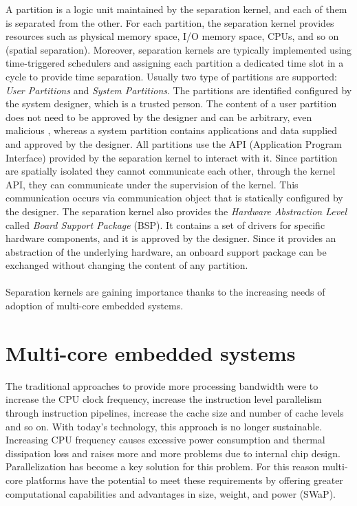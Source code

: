 A partition is a logic unit maintained by the separation kernel, and each of them is separated from the other. For each partition, the separation kernel provides resources such as physical memory space, I/O memory space, CPUs, and so on (spatial separation). Moreover, separation kernels are typically implemented using time-triggered schedulers and assigning each partition a dedicated time slot in a cycle to provide time separation. Usually two type of partitions are supported: \emph{User Partitions} and \emph{System Partitions}. The partitions are identified configured by the system designer, which is a trusted person. The content of a user partition does not need to be approved by the designer and can be arbitrary, even malicious \cite{mils}, whereas a system partition contains applications and data supplied and approved by the designer. All partitions use the API (Application Program Interface) provided by the separation kernel to interact with it. Since partition are spatially isolated they cannot communicate each other, through the kernel API, they can communicate under the supervision of the kernel. This communication occurs via communication object that is statically configured by the designer. The separation kernel also provides the \emph{Hardware Abstraction Level} called \emph{Board Support Package} (BSP). It contains a set of drivers for specific hardware components, and it is approved by the designer. Since it provides an abstraction of the underlying hardware, an onboard support package can be exchanged without changing the content of any partition.

\paragraph{} Separation kernels are gaining importance thanks to the increasing needs of adoption of multi-core embedded systems.


\section{Multi-core embedded systems}
The traditional approaches to provide more processing bandwidth were to increase the CPU clock frequency, increase the instruction level parallelism through instruction pipelines, increase the cache size and number of cache levels and so on. With today's technology, this approach is no longer sustainable. Increasing CPU frequency causes excessive power consumption and thermal dissipation loss and raises more and more problems due to internal chip design. Parallelization has become a key solution for this problem. For this reason multi-core platforms have the potential to meet these requirements by offering greater computational capabilities and advantages in size, weight, and power (SWaP). 

